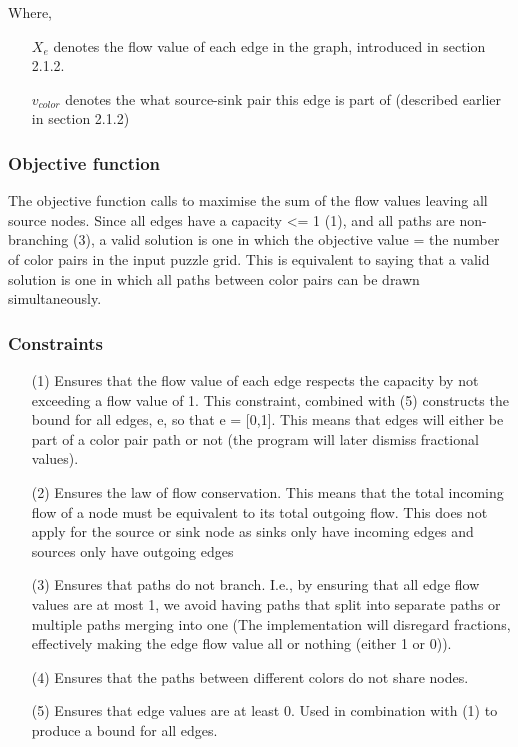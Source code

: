 \documentclass{homeworg}
\begin{document}
Where,
\begin{enumerate}
    \item[] \(X_e\) denotes the flow value of each edge in the graph, introduced in section 2.1.2.
    \item[] \(v_{color}\) denotes the what source-sink pair this edge is part of (described earlier in section 2.1.2)
\end{enumerate}

\subsubsection{Objective function}
The objective function calls to maximise the sum of the flow values leaving all source nodes. Since all edges have a capacity <= 1 (1), and all paths are non-branching (3), a valid solution is one in which the objective value = the number of color pairs in the input puzzle grid. This is equivalent to saying that a valid solution is one in which all paths between color pairs can be drawn simultaneously.

\subsubsection{Constraints}
\begin{enumerate}
    \item[(1)] Ensures that the flow value of each edge respects the capacity by not exceeding a flow value of 1. This constraint, combined with (5) constructs the bound for all edges, e, so that e = [0,1]. This means that edges will either be part of a color pair path or not (the program will later dismiss fractional values).
    \item[(2)] Ensures the law of flow conservation. This means that the total incoming flow of a node must be equivalent to its total outgoing flow. This does not apply for the source or sink node as sinks only have incoming edges and sources only have outgoing edges
    \item[(3)] Ensures that paths do not branch. I.e., by ensuring that all edge flow values are at most 1, we avoid having paths that split into separate paths or multiple paths merging into one (The implementation will disregard fractions, effectively making the edge flow value all or nothing (either 1 or 0)).
    \item[(4)] Ensures that the paths between different colors do not share nodes.
    \item[(5)] Ensures that edge values are at least 0. Used in combination with (1) to produce a bound for all edges.
\end{enumerate}
\end{document}

